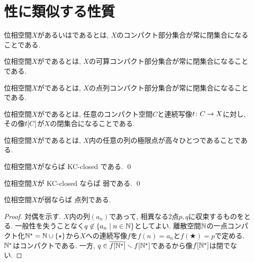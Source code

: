 \documentclass[uplatex, dvipdfmx, a4paper, 12pt, class=jsbook, crop=false]{standalone}
\begin{document}
\section{\Hausdorff 性に類似する性質}
\label{sec:Hausdorff-like-properties}

\begin{definition}
	位相空間$ X $があるいはであるとは, $ X $のコンパクト部分集合が常に閉集合になることである.
\end{definition}

\begin{definition}
	位相空間$ X $がであるとは, $ X $の可算コンパクト部分集合が常に閉集合になることである.
\end{definition}

\begin{definition}
	位相空間$ X $がであるとは, $ X $の点列コンパクト部分集合が常に閉集合になることである.
\end{definition}

\begin{definition}
	位相空間$ X $がであるとは,
	任意のコンパクト\Hausdorff 空間$ C $と連続写像$ t\colon C\to X $に対し,
	その像$ \mapset{t}{C} $が$ X $の閉集合になることである.
\end{definition}

\begin{definition}
	位相空間$ X $がであるとは, $ X $内の任意の列の極限点が高々ひとつであることである.
\end{definition}

\begin{proposition}
	位相空間$X$が\Hausdorff ならば KC-closed である.
	\qed
\end{proposition}

\begin{proposition}
	位相空間$X$が KC-closed ならば 弱\Hausdorff である.
	\qed
\end{proposition}

\begin{proposition}
	位相空間$X$が弱\Hausdorff ならば 点列\Hausdorff である.
\end{proposition}

\begin{proof}
	対偶を示す.
	$X$内の列$(a_n)$であって, 相異なる2点$p, q$に収束するものをとる.
	一般性を失うことなく$q \not\in \setcomp{a_n}{n \in \N}$としてよい.
	離散空間$\mathbb{N}$の一点コンパクト化$\mathbb{N}^\star = \mathbb{N} \cup \{\star\}$から$X$への連続写像$f$を$f(n) = a_n$と$f(\bigstar) = p$で定める.
	$\mathbb{N}^\star$はコンパクト\Hausdorff である.
	一方, $q \in \overline{f[\mathbb{N}^\star]} \smallsetminus f[\mathbb{N}^\star]$であるから像$f[\mathbb{N}^\star]$は閉でない.
\end{proof}
\end{document}
